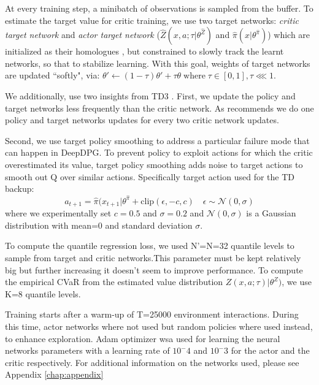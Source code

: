At every training step, a minibatch of observations is sampled from the buffer.
To estimate the target value for critic training, we use two target networks:  \textit{critic target network} and \textit{actor target network}
($\hat{Z}(x,a;\tau | \theta^{\hat{Z}})$ and  $\hat{\pi}(x | \theta^{\hat{\pi}})$) which are initialized
as their homologues , but constrained to slowly track the learnt networks, so that to stabilize learning.
With this goal, weights of target networks are updated ``softly", via:
$\theta' \leftarrow (1-\tau)\theta' + \tau\theta \; \text{where} \; \tau \in [0,1], \tau \lll 1$.

We additionally, use two insights from TD3 \citet{Fujimoto2018}.
First, we update the policy and target networks less frequently than the critic network. As 
\citet{Fujimoto2018} recommends we do one policy and target networks updates for every 
two critic network updates. 

Second, we use target policy smoothing to address a particular failure mode that can happen
in DeepDPG. To prevent policy to exploit 
actions for which the critic overestimated its value, target policy smoothing adds noise to target actions
to smooth out Q over similar actions. Specifically target action used for the TD backup:
\begin{equation}
    a_{t+1}=\hat{\pi}(x_{t+1} | \theta^{\hat{\pi}} + \text{clip}(\epsilon, -c, c) \quad \epsilon \sim \mathcal{N}(0,\sigma)
\end{equation}
where we experimentally set $c=0.5$ and $\sigma=0.2$ and $\mathcal{N}(0,\sigma)$ is a
Gaussian distribution with mean=0 and standard deviation $\sigma$.


To compute the quantile regression loss, we used N'=N=32 quantile levels to sample from
target and critic networks.This parameter must be kept relatively big but further increasing
it doesn't seem to improve performance.
To compute the empirical CVaR from the estimated value distribution 
$Z(x,a; \tau) | \theta^Z)$, we use K=8 quantile levels.


Training starts after a warm-up of T=25000 environment interactions. During this time, actor
networks where not used but random policies where used instead, to enhance exploration.
Adam optimizer wsa used for learning the neural networks parameters with a learning rate of $10^-4$ and $10^-3$
for the actor and the critic respectively.
For additional information on the networks used, please see Appendix \ref{chap:appendix}





